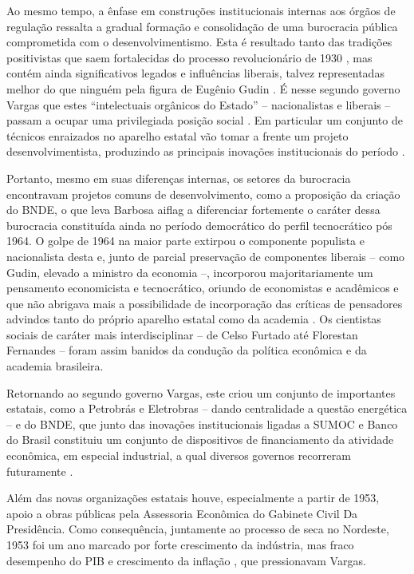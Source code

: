Ao mesmo tempo, a ênfase em construções institucionais internas aos
órgãos de regulação ressalta a gradual formação e consolidação de uma
burocracia pública comprometida com o desenvolvimentismo. Esta é
resultado tanto das tradições positivistas que saem fortalecidas do
processo revolucionário de 1930 \citep{perissinotto_ideias_2023}, mas contém ainda
significativos legados e influências liberais, talvez representadas
melhor do que ninguém pela figura de Eugênio Gudin \citep{barbosa_developmentalist_2020}. É nesse segundo governo Vargas que estes ``intelectuais
orgânicos do Estado'' -- nacionalistas e liberais -- passam a ocupar uma
privilegiada posição social \citep{barbosa_developmentalist_2020}. Em particular um conjunto de
técnicos enraizados no aparelho estatal vão tomar a frente um projeto
desenvolvimentista, produzindo as principais inovações institucionais do
período \citep{barbosa_developmentalist_2020}.

Portanto, mesmo em suas diferenças internas, os setores da burocracia
encontravam projetos comuns de desenvolvimento, como a proposição da
criação do BNDE, o que leva Barbosa aiflag \citeyearpar{barbosa_developmentalist_2020}
a diferenciar fortemente o
caráter dessa burocracia constituída ainda no período democrático do
perfil tecnocrático pós 1964. O golpe de 1964 na maior parte extirpou o
componente populista e nacionalista desta e, junto de parcial
preservação de componentes liberais -- como Gudin, elevado a ministro da
economia --, incorporou majoritariamente um pensamento economicista e
tecnocrático, oriundo de economistas e acadêmicos e que não abrigava
mais a possibilidade de incorporação das críticas de pensadores advindos
tanto do próprio aparelho estatal como da academia \citep{barbosa_developmentalist_2020}.
Os cientistas sociais de caráter mais interdisciplinar -- de Celso Furtado até
Florestan Fernandes -- foram assim banidos da condução da política
econômica e da academia brasileira.

Retornando ao segundo governo Vargas, este criou um conjunto de importantes
estatais, como a Petrobrás e Eletrobras -- dando centralidade a questão
energética -- e do BNDE, que junto das inovações institucionais ligadas
a SUMOC e Banco do Brasil constituiu um conjunto de dispositivos de
financiamento da atividade econômica, em especial industrial, a qual
diversos governos recorreram futuramente \citeyear{canocintra1974}.

Além das novas organizações estatais houve, especialmente a partir de
1953, apoio a obras públicas pela Assessoria Econômica do Gabinete Civil
Da Presidência. Como consequência, juntamente ao processo de seca no
Nordeste, 1953 foi um ano marcado por forte crescimento da indústria,
mas fraco desempenho do PIB e crescimento da inflação \citep{vianna_o_2025},
que pressionavam Vargas.

